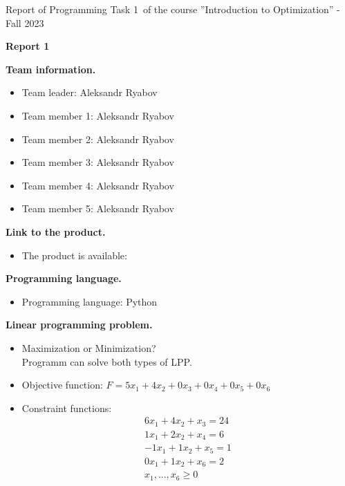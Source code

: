 \documentclass[12pt, legalpaper]{exam}
\newcommand{\course}{Introduction to Optimization}
\newcommand{\term}{Fall 2023}
\newcommand{\examnum}{Report of Programming Task 1}
\begin{document}
\noindent \examnum \, of the  course ''\course'' - \term


\noindent
{}




\vspace{12pt}
\begin{center}
    \textbf{Report 1}
\end{center}

\vspace{12pt}

\noindent  \textbf{Team information.}

\begin{itemize}
    \item Team leader: Aleksandr Ryabov
    \item Team member 1: Aleksandr Ryabov
    \item Team member 2: Aleksandr Ryabov
    \item Team member 3: Aleksandr Ryabov
    \item Team member 4: Aleksandr Ryabov
    \item Team member 5: Aleksandr Ryabov
\end{itemize}
\vspace{12pt}
\noindent     \textbf{Link to the product.}
\begin{itemize}
    \item The product is available:  
\end{itemize}

\vspace{12pt}

\noindent  \textbf{Programming language.}
\begin{itemize}
    \item Programming language: Python
\end{itemize}

\vspace{12pt}

\noindent  \textbf{Linear programming problem.}
\begin{itemize}
\item Maximization or Minimization?
\\
Programm can solve both types of LPP. 
\vspace{10pt}
    \item Objective function: $F = 5x_1 + 4x_2 + 0x_3 + 0x_4 + 0x_5 + 0x_6$
    \vspace{10pt}
    \item Constraint functions:
    \begin{gather*}
        6x_1 + 4x_2 + x_3 = 24 \\
        1x_1 + 2x_2 + x_4 = 6  \\
        -1x_1 + 1x_2 + x_5 = 1 \\
        0x_1 + 1x_2 + x_6 = 2  \\
        x_1,...,x_6 \geq 0
    \end{gather*}

\end{itemize}
\end{document}
